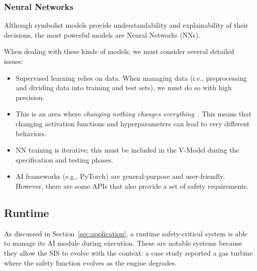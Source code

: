 \subsubsection{Neural Networks}
Although symbolist models provide understandability and explainability of their decisions, the most powerful models are Neural Networks (NNs).

When dealing with these kinds of models, we must consider several detailed issues:
\begin{itemize}
    \item Supervised learning relies on data. When managing data (i.e., preprocessing and dividing data into training and test sets), we must do so with high precision.
    \item This is an area where \textit{changing nothing changes everything}~\cite{perez2024artificial}. This means that changing activation functions and hyperparameters can lead to very different behaviors.
    \item NN training is iterative; this must be included in the V-Model during the specification and testing phases.
    \item AI frameworks (e.g., PyTorch) are general-purpose and user-friendly. However, there are some APIs that also provide a set of safety requirements.
\end{itemize}

\subsection{Runtime}
\label{sec:runtime}
As discussed in Section~\ref{sec:application}, a runtime safety-critical system is able to manage its AI module during execution. These are notable systems because they allow the SIS to evolve with the context: a case study reported a gas turbine where the safety function evolves as the engine degrades.

